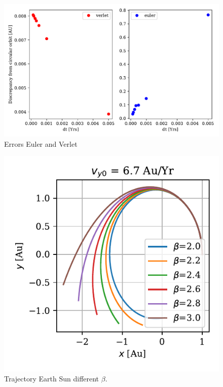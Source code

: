 \documentclass[twocolumn]{aastex62}
\begin{document}
\begin{figure}
\includegraphics[scale=1]{Figures/taskb_errors.pdf}
\caption{Errors Euler and Verlet}
\label{fig:error}
\end{figure}

\begin{figure}
\includegraphics[scale=1]{Figures/beta.pdf}
\caption{Trajectory Earth Sun different $\beta$.}
\label{fig:beta}
\end{figure}
\end{document}
